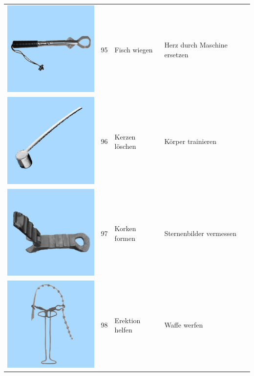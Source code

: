 \documentclass[
  english,
  man,floatsintext]{apa7}
\begin{document}
\begin{center}
\begin{ThreePartTable}
\begin{longtable}{llll}
\includegraphics[valign=c, scale=0.19]{../materials/unfamiliar/95.png} & 95 & Fisch wiegen & Herz durch Maschine ersetzen\\
\includegraphics[valign=c, scale=0.19]{../materials/unfamiliar/96.png} & 96 & Kerzen löschen & Körper trainieren\\
\includegraphics[valign=c, scale=0.19]{../materials/unfamiliar/97.png} & 97 & Korken formen & Sternenbilder vermessen\\
\includegraphics[valign=c, scale=0.19]{../materials/unfamiliar/98.png} & 98 & Erektion helfen & Waffe werfen\\

\end{longtable}
\end{ThreePartTable}
\end{center}
\end{document}
